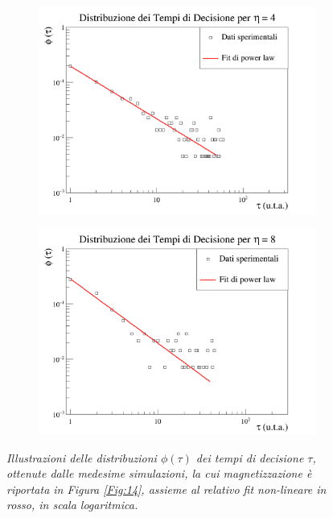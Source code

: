 \documentclass[letterpaper,10pt]{article}
\begin{document}
\begin{figure}
\ContinuedFloat
\centering
\begin{subfigure}{0.8\textwidth}
\includegraphics[width=\linewidth]{partial_time_graph_v4.png}
\end{subfigure}
\begin{subfigure}{0.8\textwidth}
\includegraphics[width=\linewidth]{partial_time_graph_v8.png}
\end{subfigure}
\caption{\textit{Illustrazioni delle distribuzioni $\phi(\tau)$ dei tempi di decisione $\tau$, ottenute dalle medesime simulazioni, la cui magnetizzazione è riportata in Figura \ref{Fig:14}, assieme al relativo fit non-lineare in rosso, in scala logaritmica.  }}
\label{Fig:15}
\end{figure}
\end{document}
